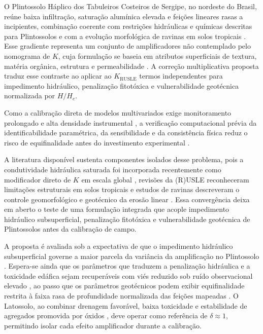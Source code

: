 \documentclass[preprint,review,12pt,authoryear]{elsarticle}
\begin{document}
O Plintossolo Háplico dos Tabuleiros Costeiros de Sergipe, no nordeste do Brasil, reúne baixa infiltração, saturação alumínica elevada e feições lineares rasas a incipientes, combinação coerente com restrições hidráulicas e químicas descritas para Plintossolos e com a evolução morfológica de ravinas em solos tropicais \citep{nascimento_pedrotti_2004,embrapa_2018,gura_et_al_2022,poesen_2018}. Esse gradiente representa um conjunto de amplificadores não contemplado pelo nomograma de $K$, cuja formulação se baseia em atributos superficiais de textura, matéria orgânica, estrutura e permeabilidade \citep{wischmeier_et_al_1971,roemkens_et_al_1997,alewell_et_al_2019}. A correção multiplicativa proposta traduz esse contraste ao aplicar ao $K_{\mathrm{RUSLE}}$ termos independentes para impedimento hidráulico, penalização fitotóxica e vulnerabilidade geotécnica normalizada por $H/H_c$.

Como a calibração direta de modelos multivariados exige monitoramento prolongado e alta densidade instrumental \citep{alewell_et_al_2019}, a verificação computacional prévia da identificabilidade paramétrica, da sensibilidade e da consistência física reduz o risco de equifinalidade antes do investimento experimental \citep{saltelli_et_al_2004,beven_freer_2001,her_chaubey_2015}.

A literatura disponível sustenta componentes isolados desse problema, pois a condutividade hidráulica saturada foi incorporada recentemente como modificador direto de $K$ em escala global \citep{gupta_et_al_2024}, revisões da (R)USLE reconheceram limitações estruturais em solos tropicais e estudos de ravinas descreveram o controle geomorfológico e geotécnico da erosão linear \citep{benavidez_et_al_2018,alewell_et_al_2019,poesen_2018,vanmaercke_et_al_2021}. Essa convergência deixa em aberto o teste de uma formulação integrada que acople impedimento hidráulico subsuperficial, penalização fitotóxica e vulnerabilidade geotécnica de Plintossolos antes da calibração de campo.

A proposta é avaliada sob a expectativa de que o impedimento hidráulico subsuperficial governe a maior parcela da variância da amplificação no Plintossolo \citep{gupta_et_al_2024}. Espera-se ainda que os parâmetros que traduzem a penalização hidráulica e a toxicidade edáfica sejam recuperáveis com viés reduzido sob ruído observacional elevado \citep{cheviron_et_al_2010,rao_et_al_2016}, ao passo que os parâmetros geotécnicos podem exibir equifinalidade restrita à faixa rasa de profundidade normalizada das feições mapeadas \citep{gudino_elizondo_et_al_2018}. O Latossolo, ao combinar drenagem favorável, baixa toxicidade e estabilidade de agregados promovida por óxidos \citep{barthes_roose_2002}, deve operar como referência de $\delta \approx 1$, permitindo isolar cada efeito amplificador durante a calibração.
\end{document}
